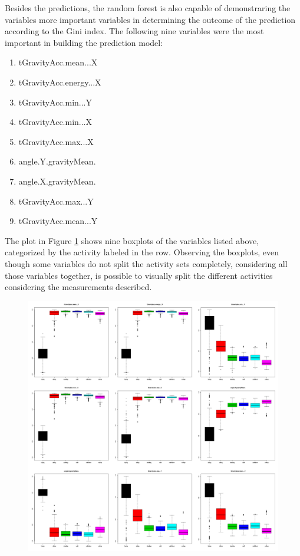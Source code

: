\documentclass[IEEEtran]{IEEEtran}
\begin{document}
Besides the predictions, the random forest is also capable of demonstraring the
variables more important variables in determining the outcome of the prediction
according to the Gini index. The following nine variables were the most important
in building the prediction model:

\begin{enumerate}
    \item tGravityAcc.mean...X
    \item tGravityAcc.energy...X
    \item tGravityAcc.min...Y
    \item tGravityAcc.min...X
    \item tGravityAcc.max...X
    \item angle.Y.gravityMean.
    \item angle.X.gravityMean.
    \item tGravityAcc.max...Y
    \item tGravityAcc.mean...Y
\end{enumerate}

The plot in Figure \ref{fig:boxplots} shows nine boxplots of the variables listed
above, categorized by the activity labeled in the row. Observing the boxplots,
even though some variables do not split the activity sets completely,
considering all those variables together, is possible to visually split the
different activities considering the measurements described.

\begin{figure}[ht]
    \centering
    \includegraphics[width=16cm]{img/plots.png}
    \caption{}
    \label{fig:boxplots}
\end{figure}
\end{document}
